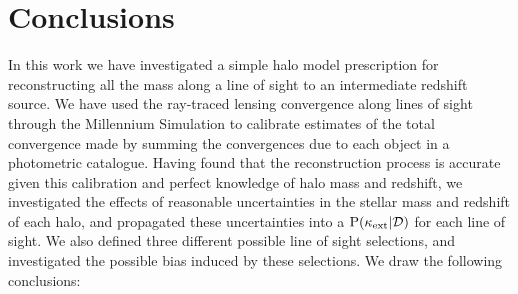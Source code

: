 \documentclass[useAMS,usenatbib,a4paper]{mn2e}
\begin{document}
\section{Conclusions}
\label{sec:conclude}

In this work we have investigated a simple halo model prescription for
reconstructing all the mass along a line of sight to an intermediate redshift
source. We have used the ray-traced lensing convergence along lines of sight
through the Millennium Simulation to calibrate estimates of the total
convergence made by summing the convergences due to each object in a
photometric catalogue. Having found that the reconstruction process is
accurate given this calibration and perfect knowledge of halo mass and
redshift, we investigated the effects of reasonable uncertainties in the
stellar mass and redshift of each halo, and propagated these uncertainties
into a ${\rm P}(\kappa_{\rm ext}|{\mathcal{D}})$ for each line of sight. We also defined three
different possible line of sight selections, and investigated the possible 
bias induced by these selections. We draw the following conclusions:
\end{document}
